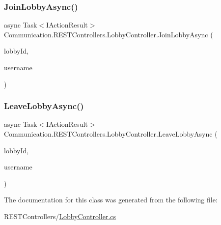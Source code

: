 \subsubsection{\texorpdfstring{Join\+Lobby\+Async()}{JoinLobbyAsync()}}
{\footnotesize\ttfamily async Task$<$I\+Action\+Result$>$ Communication.\+R\+E\+S\+T\+Controllers.\+Lobby\+Controller.\+Join\+Lobby\+Async (\begin{DoxyParamCaption}\item[{\mbox{[}\+From\+Query\mbox{]} string}]{lobby\+Id,  }\item[{\mbox{[}\+From\+Header\mbox{]} string}]{username }\end{DoxyParamCaption})}

\mbox{\label{class_communication_1_1_r_e_s_t_controllers_1_1_lobby_controller_a85eeb02c29c53fd63d6a5d1765128854}} 
\subsubsection{\texorpdfstring{Leave\+Lobby\+Async()}{LeaveLobbyAsync()}}
{\footnotesize\ttfamily async Task$<$I\+Action\+Result$>$ Communication.\+R\+E\+S\+T\+Controllers.\+Lobby\+Controller.\+Leave\+Lobby\+Async (\begin{DoxyParamCaption}\item[{\mbox{[}\+From\+Query\mbox{]} string}]{lobby\+Id,  }\item[{\mbox{[}\+From\+Header\mbox{]} string}]{username }\end{DoxyParamCaption})}



The documentation for this class was generated from the following file\+:\begin{DoxyCompactItemize}
\item 
R\+E\+S\+T\+Controllers/\mbox{\hyperlink{_lobby_controller_8cs}{Lobby\+Controller.\+cs}}\end{DoxyCompactItemize}
